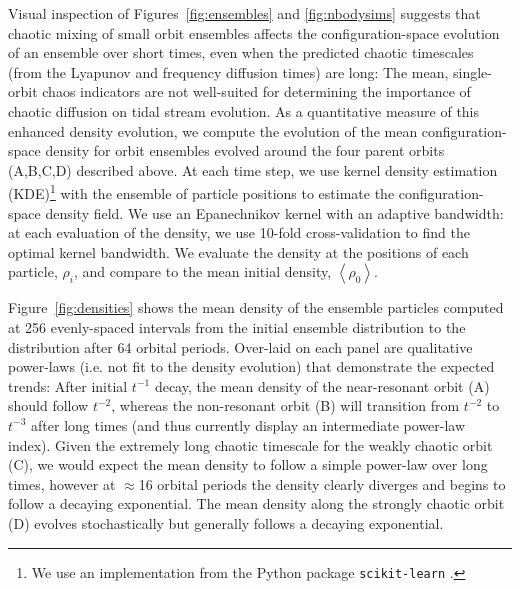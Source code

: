 \documentclass{mn2e}
\newcommand{\mean}[1]{\left< #1 \right>}
\begin{document}
Visual inspection of Figures~\ref{fig:ensembles} and \ref{fig:nbodysims} suggests that chaotic mixing of small orbit ensembles affects the configuration-space evolution of an ensemble over short times, even when the predicted chaotic timescales (from the Lyapunov and frequency diffusion times) are long: The mean, single-orbit chaos indicators are not well-suited for determining the importance of chaotic diffusion on tidal stream evolution. As a quantitative measure of this enhanced density evolution, we compute the evolution of the mean configuration-space density for orbit ensembles evolved around the four parent orbits (A,B,C,D) described above. At each time step, we use kernel density estimation (KDE)\footnote{We use an implementation from the Python package \texttt{scikit-learn} \citep{scikitlearn}.} with the ensemble of particle positions to estimate the configuration-space density field. We use an Epanechnikov kernel with an adaptive bandwidth: at each evaluation of the density, we use 10-fold cross-validation to find the optimal kernel bandwidth. We evaluate the density at the positions of each particle, $\rho_i$, and compare to the mean initial density, $\mean{\rho_0}$.

Figure~\ref{fig:densities} shows the mean density of the ensemble particles computed at 256 evenly-spaced intervals from the initial ensemble distribution to the distribution after 64 orbital periods. Over-laid on each panel are qualitative power-laws (i.e. not fit to the density evolution) that demonstrate the expected trends: After initial $t^{-1}$ decay, the mean density of the near-resonant orbit (A) should follow $t^{-2}$, whereas the non-resonant orbit (B) will transition from $t^{-2}$ to $t^{-3}$ after long times (and thus currently display an intermediate power-law index). Given the extremely long chaotic timescale for the weakly chaotic orbit (C), we would expect the mean density to follow a simple power-law over long times, however at $\approx$16 orbital periods the density clearly diverges and begins to follow a decaying exponential. The mean density along the strongly chaotic orbit (D) evolves stochastically but generally follows a decaying exponential.
\end{document}
